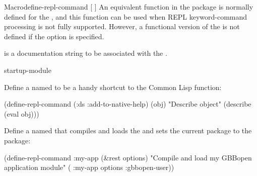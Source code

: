 \documentclass[10pt,twoside,english,pdftex]{article}
\begin{document}
\begin{functiondoc}{Macro}{define-repl-command}{ [\superstar{} \vbar{}
     ] \superstar}
An equivalent function in the  package is normally
defined for the  , and this
function can be used when REPL keyword-command processing is not fully
supported.  However, a  functional version of the
 is not defined if the  option is
specified.

 is a documentation string to be associated
with the  .

\begin{alsos}{startup-module}
\end{alsos}

\fnexamples
Define a  named  to be a handy
shortcut to the Common Lisp  function:
%
\W\supp
\begin{example}
  (define-repl-command (:ds :add-to-native-help) (obj)
    "Describe object"
    (describe (eval obj)))
\end{example}

Define a  named  that compiles and loads the
  and sets the current package to the
 package:
%
\W\supp
\begin{example}
  (define-repl-command :my-app (&rest options)
    "Compile and load my GBBopen application module"
    ( :my-app options :gbbopen-user))
\end{example} 

\end{functiondoc}

\end{document}
